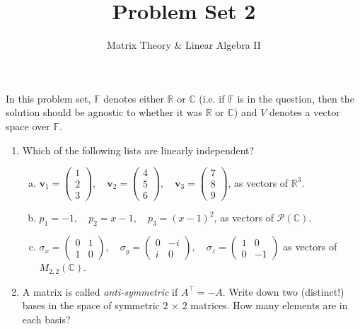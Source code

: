 \documentclass[a4paper,11pt]{article}
\title{Problem Set 2}
\author{Matrix Theory \& Linear Algebra II}
\date{}
\theoremstyle{definition}
\begin{document}
\maketitle
\thispagestyle{empty}

\noindent
In this problem set, $\mathbb F$ denotes either $\mathbb R$ or $\mathbb C$ (i.e. if $\mathbb F$ is in the question, then the solution should be agnostic to whether it was $\mathbb R$ or $\mathbb C$) and $V$ denotes a vector space over $\mathbb F$.

\begin{enumerate}[(1)]
\item
Which of the following lists are linearly independent?
\begin{enumerate}[(a)]
    \item 
    $
    \mathbf{v}_1 = \begin{pmatrix} 1 \\ 2 \\ 3 \end{pmatrix}, \quad
    \mathbf{v}_2 = \begin{pmatrix} 4 \\ 5 \\ 6 \end{pmatrix}, \quad
    \mathbf{v}_3 = \begin{pmatrix} 7 \\ 8 \\ 9 \end{pmatrix}
    $,
    as vectors of $\mathbb R^3$.
    \item 
    $
    p_1 = -1, \quad
    p_2 = x-1, \quad
    p_3 = (x-1)^2$,
    as vectors of $\mathcal P(\mathbb C)$.
    \item
    $
    \sigma_x=
    \begin{pmatrix} 0 & 1 \\ 1 & 0 \end{pmatrix}, \quad \sigma_y = \begin{pmatrix} 0 & -i \\ i & 0 \end{pmatrix}, \quad \sigma_z = \begin{pmatrix} 1 & 0 \\ 0 & -1 \end{pmatrix}
    $
    as vectors of $M_{2,2}(\mathbb C)$.
\end{enumerate}

\item 
A matrix is called \textit{anti-symmetric} if $A^\intercal = -A$.
Write down two (distinct!) bases in the
space of symmetric 2 × 2 matrices.
How many elements are in each basis?


\end{enumerate}
\end{document}
